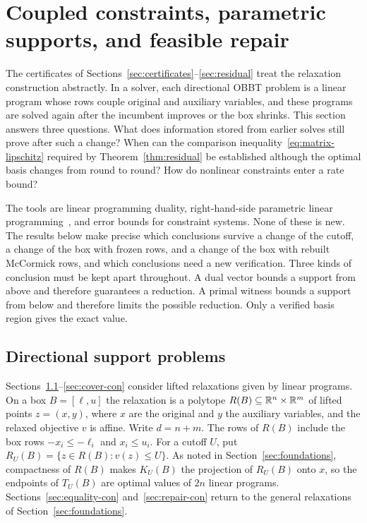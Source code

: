 \section{Coupled constraints, parametric supports, and feasible repair}\label{sec:constraints}

The certificates of Sections~\ref{sec:certificates}--\ref{sec:residual}
treat the relaxation construction abstractly. In a solver, each
directional OBBT problem is a linear program whose rows couple original
and auxiliary variables, and these programs are solved again after the
incumbent improves or the box shrinks. This section answers three
questions. What does information stored from earlier solves still prove
after such a change? When can the comparison
inequality~\eqref{eq:matrix-lipschitz} required by
Theorem~\ref{thm:residual} be established although the optimal basis
changes from round to round? How do nonlinear constraints enter a rate
bound?

The tools are linear programming duality, right-hand-side parametric
linear programming~\cite{borrelli2003parametric}, and error bounds for
constraint systems. None of these is new. The results below make precise which conclusions survive a change
of the cutoff, a change of the box with frozen rows, and a change of the
box with rebuilt McCormick rows, and which conclusions need a new
verification. Three kinds of conclusion must be kept apart throughout. A
dual vector bounds a support from above and therefore guarantees a
reduction. A primal witness bounds a support from below and therefore
limits the possible reduction. Only a verified basis region gives the
exact value.

\subsection{Directional support problems}\label{sec:supports-con}

Sections~\ref{sec:supports-con}--\ref{sec:cover-con} consider lifted
relaxations given by linear programs. On a box $B=[\ell,u]$ the relaxation
is a polytope $R(B)\subseteq\mathbb{R}^n\times\mathbb{R}^m$ of lifted points $z=(x,y)$,
where $x$ are the original and $y$ the auxiliary variables, and the
relaxed objective $v$ is affine. Write $d=n+m$. The rows of $R(B)$ include
the box rows $-x_i\le-\ell_i$ and $x_i\le u_i$. For a cutoff $U$, put
$R_U(B)=\{z\in R(B):v(z)\le U\}$. As noted in
Section~\ref{sec:foundations}, compactness of $R(B)$ makes $K_U(B)$ the
projection of $R_U(B)$ onto $x$, so the endpoints of $T_U(B)$ are optimal
values of $2n$ linear programs. Sections~\ref{sec:equality-con}
and~\ref{sec:repair-con} return to the general relaxations of
Section~\ref{sec:foundations}.

